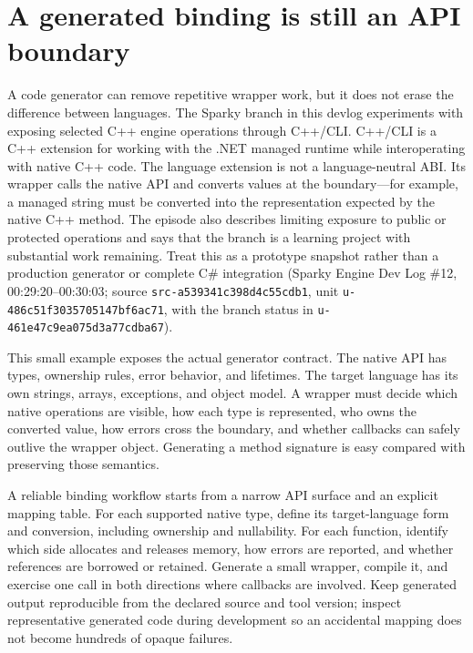 \section{A generated binding is still an API boundary}\label{01-foundations-i-ch016-a-generated-binding-is-still-an-api-boundary}

A code generator can remove repetitive wrapper work, but it does not erase the difference between languages. The Sparky branch in this devlog experiments with exposing selected C++ engine operations through C++/CLI. C++/CLI is a C++ extension for working with the .NET managed runtime while interoperating with native C++ code. The language extension is not a language-neutral ABI. Its wrapper calls the native API and converts values at the boundary---for example, a managed string must be converted into the representation expected by the native C++ method. The episode also describes limiting exposure to public or protected operations and says that the branch is a learning project with substantial work remaining. Treat this as a prototype snapshot rather than a production generator or complete C\# integration (Sparky Engine Dev Log \#12, 00:29:20--00:30:03; source \texttt{src-a539341c398d4c55cdb1}, unit \texttt{u-486c51f3035705147bf6ac71}, with the branch status in \texttt{u-461e47c9ea075d3a77cdba67}).

This small example exposes the actual generator contract. The native API has types, ownership rules, error behavior, and lifetimes. The target language has its own strings, arrays, exceptions, and object model. A wrapper must decide which native operations are visible, how each type is represented, who owns the converted value, how errors cross the boundary, and whether callbacks can safely outlive the wrapper object. Generating a method signature is easy compared with preserving those semantics.

A reliable binding workflow starts from a narrow API surface and an explicit mapping table. For each supported native type, define its target-language form and conversion, including ownership and nullability. For each function, identify which side allocates and releases memory, how errors are reported, and whether references are borrowed or retained. Generate a small wrapper, compile it, and exercise one call in both directions where callbacks are involved. Keep generated output reproducible from the declared source and tool version; inspect representative generated code during development so an accidental mapping does not become hundreds of opaque failures.

